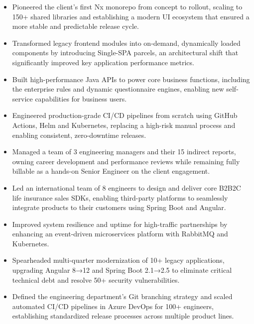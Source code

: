 \begin{itemize}[leftmargin=*, itemsep=\bulletItemSeparation, topsep=0pt]
    \item Pioneered the client's first Nx monorepo from concept to rollout, scaling to 150+ shared libraries and establishing a modern UI ecosystem that ensured a more stable and predictable release cycle.
    \item Transformed legacy frontend modules into on-demand, dynamically loaded components by introducing Single-SPA parcels, an architectural shift that significantly improved key application performance metrics.
    \item Built high-performance Java APIs to power core business functions, including the enterprise rules and dynamic questionnaire engines, enabling new self-service capabilities for business users.
    \item Engineered production-grade CI/CD pipelines from scratch using GitHub Actions, Helm and Kubernetes, replacing a high-risk manual process and enabling consistent, zero-downtime releases.
    \item Managed a team of 3 engineering managers and their 15 indirect reports, owning career development and performance reviews while remaining fully billable as a hands-on Senior Engineer on the client engagement.
\end{itemize}
\vspace{\spacingBetweenJobs}

\begin{itemize}[leftmargin=*, itemsep=\bulletItemSeparation, topsep=0pt]
    \item Led an international team of 8 engineers to design and deliver core B2B2C life insurance sales SDKs, enabling third-party platforms to seamlessly integrate products to their customers using Spring Boot and Angular.
    \item Improved system resilience and uptime for high-traffic partnerships by enhancing an event-driven microservices platform with RabbitMQ and Kubernetes.
    \item Spearheaded multi-quarter modernization of 10+ legacy applications, upgrading Angular 8→12 and Spring Boot 2.1→2.5 to eliminate critical technical debt and resolve 50+ security vulnerabilities.
    \item Defined the engineering department's Git branching strategy and scaled automated CI/CD pipelines in Azure DevOps for 100+ engineers, establishing standardized release processes across multiple product lines.
\end{itemize}
\vspace{\spacingBetweenJobs}

